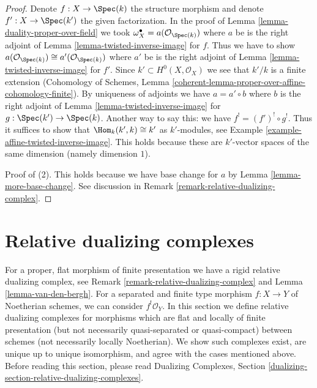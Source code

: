 \begin{proof}
Denote $f : X \to \Spec(k)$ the structure morphism and denote
$f' : X \to \Spec(k')$ the given factorization.
In the proof of Lemma \ref{lemma-duality-proper-over-field}
we took $\omega_X^\bullet = a(\mathcal{O}_{\Spec(k)})$
where $a$ be is the right adjoint of
Lemma \ref{lemma-twisted-inverse-image} for $f$.
Thus we have to show
$a(\mathcal{O}_{\Spec(k)}) \cong a'(\mathcal{O}_{\Spec(k)})$
where $a'$ be is the right adjoint of
Lemma \ref{lemma-twisted-inverse-image} for $f'$.
Since $k' \subset H^0(X, \mathcal{O}_X)$ we see that $k'/k$ is a finite
extension (Cohomology of Schemes, Lemma
\ref{coherent-lemma-proper-over-affine-cohomology-finite}).
By uniqueness of adjoints we have $a = a' \circ b$ where
$b$ is the right adjoint of Lemma
\ref{lemma-twisted-inverse-image} for $g : \Spec(k') \to \Spec(k)$.
Another way to say this: we have $f^! = (f')^! \circ g^!$.
Thus it suffices to show that $\Hom_k(k', k) \cong k'$ as
$k'$-modules, see Example \ref{example-affine-twisted-inverse-image}.
This holds because these are $k'$-vector spaces of
the same dimension (namely dimension $1$).

\medskip\noindent
Proof of (2). This holds because we have base change for $a$ by
Lemma \ref{lemma-more-base-change}. See discussion in
Remark \ref{remark-relative-dualizing-complex}.
\end{proof}








\section{Relative dualizing complexes}
\label{section-relative-dualizing-complexes}

\noindent
For a proper, flat morphism of finite presentation we have a
rigid relative dualizing complex, see
Remark \ref{remark-relative-dualizing-complex} and
Lemma \ref{lemma-van-den-bergh}. For a separated and finite type
morphism $f : X \to Y$ of Noetherian schemes, we can consider
$f^!\mathcal{O}_Y$. In this section we define relative dualizing complexes
for morphisms which are flat and locally of finite presentation
(but not necessarily quasi-separated or quasi-compact) between
schemes (not necessarily locally Noetherian).
We show such complexes exist, are unique up to unique
isomorphism, and agree with the cases mentioned above.
Before reading this section, please read
Dualizing Complexes, Section
\ref{dualizing-section-relative-dualizing-complexes}.

